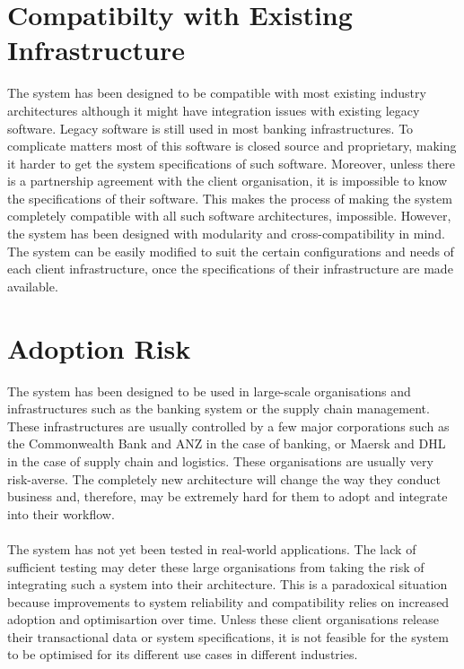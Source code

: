 \documentclass[a4paper,twoside,phd]{BYUPhys}
\begin{document}
\section{Compatibilty with Existing Infrastructure}
The system has been designed to be compatible with most existing industry architectures although it might have integration issues with existing legacy software\cite{}. Legacy software is still used in most banking infrastructures. To complicate matters most of this software is closed source and proprietary, making it harder to get the system specifications of such software. Moreover, unless there is a partnership agreement with the client organisation, it is impossible to know the specifications of their software. This makes the process of making the system completely compatible with all such software architectures, impossible. However, the system has been designed with modularity and cross-compatibility in mind. The system can be easily modified to suit the certain configurations and needs of each client infrastructure, once the specifications of their infrastructure are made available.
\section{Adoption Risk}
The system has been designed to be used in large-scale organisations and infrastructures such as the banking system or the supply chain management. These infrastructures are usually controlled by a few major corporations such as the Commonwealth Bank and ANZ in the case of banking, or Maersk and DHL in the case of supply chain and logistics. These organisations are usually very risk-averse\cite{}. The completely new architecture will change the way they conduct business and, therefore, may be extremely hard for them to adopt and integrate into their workflow.
\\
\\
The system has not yet been tested in real-world applications. The lack of sufficient testing may deter these large organisations from taking the risk of integrating such a system into their architecture. This is a paradoxical situation because improvements to system reliability and compatibility relies on increased adoption and optimisartion over time. Unless these client organisations release their transactional data or system specifications, it is not feasible for the system to be optimised for its different use cases in different industries.
\end{document}
